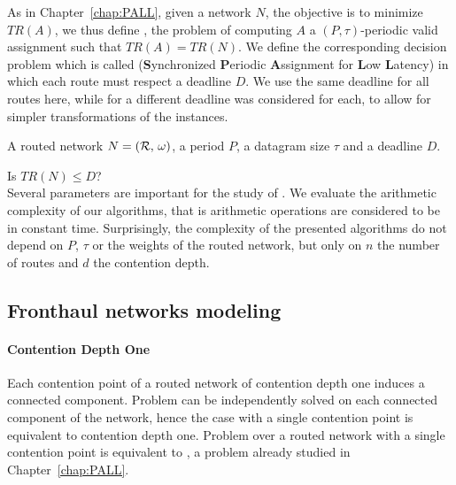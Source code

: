   As in Chapter~\ref{chap:PALL}, given a network $N$, the objective is to minimize $TR(A)$, we thus define \minstra, the problem of computing $A$ a $(P,\tau)$-periodic valid assignment such that $TR(A) = TR(N)$. We define the corresponding decision problem which is called \spall (\textbf{S}ynchronized \textbf{P}eriodic \textbf{A}ssignment for \textbf{L}ow \textbf{L}atency) in which each route must respect a deadline $D$. We use the same deadline for all routes here, 
  while for \pall a different deadline was considered for each, to allow for simpler transformations of the instances. 


        A routed network $N = ({\cal R},\,\omega)$, a period $P$, a datagram size $\tau$ and a deadline $D$.%
      

       Is $TR(N) \leq D$?
      \\
    
    Several parameters are important for the study of \spall. We evaluate the arithmetic complexity of our algorithms, that is arithmetic operations are considered to be in constant time. Surprisingly, the complexity of the presented algorithms do not depend on $P$, $\tau$ or the weights of the routed network, but only on $n$ the number of routes and $d$ the contention depth.

\subsection{Fronthaul networks modeling}\label{sec:fronthaul}

\paragraph*{Contention Depth One}

Each contention point of a routed network of contention depth one induces a connected component. 
Problem \spall can be independently solved on each connected component of the network, hence the case with a single contention point is equivalent to contention depth one. Problem \spall over a routed network with a single contention point is equivalent to \wta, a problem already studied in Chapter~\ref{chap:PALL}. 


